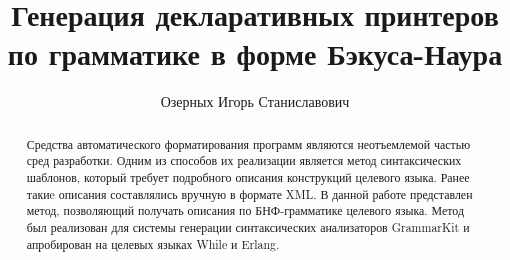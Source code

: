 \title{Генерация декларативных принтеров по грамматике в форме Бэкуса-Наура}


\author{Озерных Игорь Станиславович}



\maketitle             

\begin{abstract}
Средства автоматического форматирования программ
являются неотъемлемой частью сред разработки.
Одним из способов их реализации является метод
синтаксических шаблонов, который требует подробного
описания конструкций целевого языка. Ранее такиe описания
составлялись вручную в формате XML. В данной работе
представлен метод, позволяющий получать описания по БНФ-грамматике
целевого языка. Метод был реализован для системы
генерации синтаксических анализаторов GrammarKit и апробирован
на целевых языках While и Erlang.
\end{abstract}










